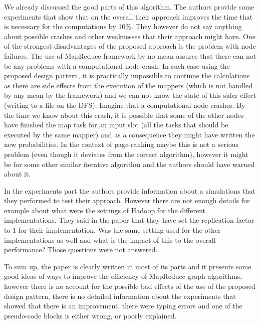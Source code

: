\documentclass[12pt]{article}
\theoremstyle{plain}
\begin{document}
  We already discussed the good parts of this algorithm. The authors provide
  some experiments that show that on the overall their approach improves the 
  time that is necessary for the computations by 10\%. They however do not say
  anything about possible crashes and other weaknesses that their approach
  might have. One of the strongest disadvantages of the proposed approach is the problem with
  node failures. The use of MapReduce framework by no mean assures that there can
  not be any problems with a computational node crash. In such case using the proposed
  design pattern, it is practically impossible to continue the calculations as 
  there are side effects from the execution of the mappers (which is not handled
  by any mean by the framework) and we can not know the state of this sider
  effect (writing to a file on the DFS). Imagine that a computational node 
  crashes. By the time we know about this crash, it is possible that some of the
  other nodes have finished the map task for an input slot (all the tasks that
  should be executed by the same mapper) and as a consequence they might have
  written the new probabilities. In the context of page-ranking maybe this is not a 
  serious problem (even though it deviates from the correct algorithm), however
  it might be for some other similar iterative algorithm and the authors should
  have warned about it.

In the experiments part the authors provide information about a simulations
that they performed to test their approach. However there are not enough details
for example about what were the settings of Hadoop for the different
implementations. They said in the paper that they have set the replication
factor to 1 for their implementation. Was the same setting used for the other
implementations as well and what is the impact of this to the overall 
performance? Those questions were not answered.

To sum up, the paper is clearly written in most of its parts and it presents
some good ideas of ways to improve the efficiency of MapReduce graph algorithms,
however there is no account for the possible bad effects of the use of the 
proposed design pattern, there is no detailed information about the experiments
that showed that there is an improvement, there were typing errors and one of
the pseudo-code blocks is either wrong, or poorly explained. 

\end{document}
